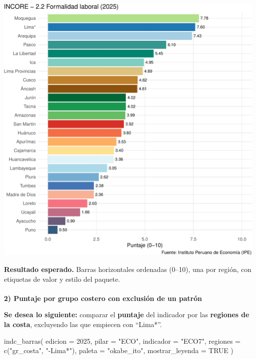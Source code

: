 \documentclass[
  11pt,
  letterpaper,
  DIV=11,
  numbers=noendperiod]{scrartcl}
\makeatletter
\let\oldparagraph\paragraph
\renewcommand{\paragraph}{
    \@ifstar
      \xxxParagraphStar
      \xxxParagraphNoStar
  }
\newcommand{\xxxParagraphStar}[1]{\oldparagraph*{#1}\mbox{}}
\newcommand{\xxxParagraphNoStar}[1]{\oldparagraph{#1}\mbox{}}
\newenvironment{Shaded}{\begin{snugshade}}{\end{snugshade}}
\newcommand{\AttributeTok}[1]{\textcolor[rgb]{0.40,0.45,0.13}{#1}}
\newcommand{\ConstantTok}[1]{\textcolor[rgb]{0.56,0.35,0.01}{#1}}
\newcommand{\DecValTok}[1]{\textcolor[rgb]{0.68,0.00,0.00}{#1}}
\newcommand{\FunctionTok}[1]{\textcolor[rgb]{0.28,0.35,0.67}{#1}}
\newcommand{\NormalTok}[1]{\textcolor[rgb]{0.00,0.23,0.31}{#1}}
\newcommand{\StringTok}[1]{\textcolor[rgb]{0.13,0.47,0.30}{#1}}
\makeatother
\begin{document}
\includegraphics{Manual_files/figure-pdf/unnamed-chunk-73-1.pdf}

\textbf{Resultado esperado.} Barras horizontales ordenadas (0--10), una
por región, con etiquetas de valor y estilo del paquete.

\paragraph{\texorpdfstring{\textbf{2) Puntaje por grupo costero con
exclusión de un
patrón}}{2) Puntaje por grupo costero con exclusión de un patrón}}\label{puntaje-por-grupo-costero-con-exclusiuxf3n-de-un-patruxf3n}

\textbf{Se desea lo siguiente:} comparar el \textbf{puntaje} del
indicador por las \textbf{regiones de la costa}, excluyendo las que
empiecen con ``Lima*''.

\begin{Shaded}
\begin{Highlighting}[]
\FunctionTok{indc\_barras}\NormalTok{(}
  \AttributeTok{edicion   =} \DecValTok{2025}\NormalTok{,}
  \AttributeTok{pilar     =} \StringTok{"ECO"}\NormalTok{,}
  \AttributeTok{indicador =} \StringTok{"ECO7"}\NormalTok{,}
  \AttributeTok{regiones  =} \FunctionTok{c}\NormalTok{(}\StringTok{"gr\_costa"}\NormalTok{, }\StringTok{"{-}Lima*"}\NormalTok{),}
  \AttributeTok{paleta    =} \StringTok{"okabe\_ito"}\NormalTok{,}
  \AttributeTok{mostrar\_leyenda =} \ConstantTok{TRUE}
\NormalTok{)}
\end{Highlighting}
\end{Shaded}
\end{document}
